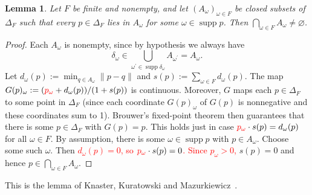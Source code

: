 \documentclass[11pt]{article}
\newtheorem{lemma}[theorem]{Lemma}
\theoremstyle{definition}
\newcommand{\supp}{\operatorname{supp}}
\newcommand{\new}[1]{\textcolor{red}{#1}}
\begin{document}
\begin{lemma}\label{lem:kkm}
Let $F$ be finite and nonempty, and let $(A_\omega)_{\omega\in F}$ be closed subsets of $\Delta_F$ such that every $p\in\Delta_F$ lies in $A_\omega$ for some $\omega\in\supp p$. Then $\bigcap_{\omega\in F}A_\omega\ne\varnothing$.
\end{lemma}
\begin{proof}
Each $A_\omega$ is nonempty, since by hypothesis we always have 
\[
\delta_\omega\in\bigcup_{\omega^\prime\in\supp \delta_\omega}A_{\omega^\prime}=A_\omega.
\]
Let $d_\omega(p):=\min_{q\in A_\omega}\lVert p-q \rVert$ and $s(p):=\sum_{\omega\in F} d_\omega(p)$. The map $G(p)_\omega:=(\textcolor{red}{p_\omega}+d_\omega(p))/(1+s(p))$ is continuous. Moreover, $G$ maps each $p\in\Delta_F$ to some point in $\Delta_F$ (since each coordinate $G(p)_\omega$ of $G(p)$ is nonnegative and these coordinates sum to 1). Brouwer's fixed-point theorem then guarantees that there is some $p\in\Delta_F$ with $G(p)=p$. This holds just in case $\textcolor{red}{p_\omega}\cdot s(p)=d_\omega(p)$ for all $\omega\in F$. By assumption, there is some $\omega\in\supp p$ with $p\in A_\omega$. Choose some such $\omega$. Then \new{$d_\omega(p)=0$, so} $\textcolor{red}{p_\omega}\cdot s(p)=0$\new{. Since $p_\omega>0$,} $s(p)=0$ and hence $p\in\bigcap_{\omega\in F}A_\omega$.
\end{proof}

This is the lemma of Knaster, Kuratowski and Mazurkiewicz~\cite{KKM}.
\end{document}
